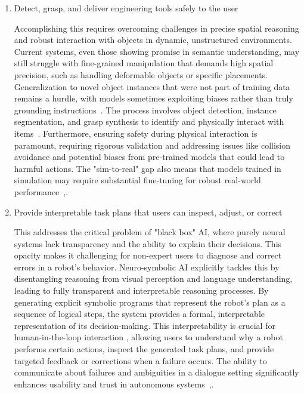 \documentclass[12pt]{extarticle}
\begin{document}
\begin{enumerate}
  \item Detect, grasp, and deliver engineering tools safely to the user

  Accomplishing this requires overcoming challenges in precise spatial reasoning and robust interaction with objects in dynamic, unstructured environments. Current systems, even those showing promise in semantic understanding, may still struggle with fine-grained manipulation that demands high spatial precision, such as handling deformable objects or specific placements. Generalization to novel object instances that were not part of training data remains a hurdle, with models sometimes exploiting biases rather than truly grounding instructions~\cite{cliport}. The process involves object detection, instance segmentation, and grasp synthesis to identify and physically interact with items~\cite{enhancing-interpret}. Furthermore, ensuring safety during physical interaction is paramount, requiring rigorous validation and addressing issues like collision avoidance and potential biases from pre-trained models that could lead to harmful actions. The "sim-to-real" gap also means that models trained in simulation may require substantial fine-tuning for robust real-world performance~\cite{enhancing-interpret},\cite{cliport}.

  \item Provide interpretable task plans that users can inspect, adjust, or correct

  This addresses the critical problem of "black box" AI, where purely neural systems lack transparency and the ability to explain their decisions. This opacity makes it challenging for non-expert users to diagnose and correct errors in a robot's behavior. Neuro-symbolic AI explicitly tackles this by disentangling reasoning from visual perception and language understanding, leading to fully transparent and interpretable reasoning processes. By generating explicit symbolic programs that represent the robot's plan as a sequence of logical steps, the system provides a formal, interpretable representation of its decision-making. This interpretability is crucial for human-in-the-loop interaction , allowing users to understand why a robot performs certain actions, inspect the generated task plans, and provide targeted feedback or corrections when a failure occurs. The ability to communicate about failures and ambiguities in a dialogue setting significantly enhances usability and trust in autonomous systems~\cite{enhancing-interpret},\cite{nsai}.
\end{enumerate}
\end{document}

